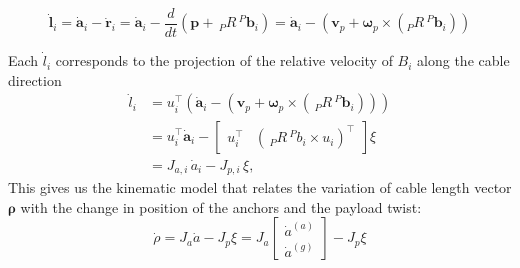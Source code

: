 \begin{equation}
    \dot{\boldsymbol{l}}_i = \dot{\boldsymbol{a}}_i - \dot{\boldsymbol{r}}_i = \dot{\boldsymbol{a}}_i - \frac{d}{dt}\left(\boldsymbol{p} + \, _PR \, ^P\boldsymbol{b}_i \right) =\dot{\boldsymbol{a}}_i - \left(\boldsymbol{v}_p + \boldsymbol{\omega}_p \times \left( _PR \, ^P\boldsymbol{b}_i \right)\right)
\end{equation}


Each $\dot{l}_i$ corresponds to the projection of the relative velocity of $B_i$ along the cable direction
\begin{equation}
\begin{aligned}
    \dot{l}_i 
    &= u_i^\top \left( 
        \dot{\boldsymbol{a}}_i 
        - \left( 
            \boldsymbol{v}_p 
            + \boldsymbol{\omega}_p \times (\, _P R \, ^P\boldsymbol{b}_i ) 
        \right) 
    \right) \\
    &= u_i^\top \dot{\boldsymbol{a}}_i 
    - 
    \begin{bmatrix}
        u_i^\top & (\, _P R \, ^P b_i \times u_i )^\top
    \end{bmatrix}
    \xi \\
    &= J_{a,i}\, \dot{a}_i - J_{p,i}\, \xi ,
\end{aligned}
\label{eq:cablelengthrate}
\end{equation}
This gives us the kinematic model that relates the variation of cable length vector $\boldsymbol{\rho}$ with the change in position of the anchors and the payload twist:
\begin{equation}
    \dot{\rho} = J_a \dot{a} - J_p \xi = J_a \begin{bmatrix}
        \dot{a}^{(a)} \\ \dot{a}^{(g)}
    \end{bmatrix} - J_p \xi
    \label{eq:kinematic_model}
\end{equation}

